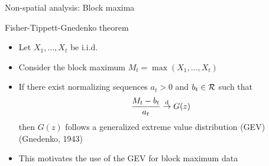 \documentclass{beamer}
\begin{document}



\begin{frame}{Non-spatial analysis: Block maxima}
	\begin{adjustwidth}{1em}{0em}
		Fisher-Tippett-Gnedenko theorem \vspace{1em}
		\begin{itemize} \setlength{\itemsep}{1em}
			\item Let $X_1, \ldots, X_t$ be i.i.d.
			\item Consider the block maximum $M_t = \max(X_1, \ldots, X_t)$
			\item If there exist normalizing sequences $a_t > 0$ and $b_t \in {\cal R}$ such that $$\frac{ M_t - b_t }{ a_t } \stackrel{\mathrm{d}}{\rightarrow} G(z)$$ then $G(z)$ follows a generalized extreme value distribution (GEV) (Gnedenko, 1943)
			\item This motivates the use of the GEV for block maximum data
		\end{itemize}
	\end{adjustwidth}
\end{frame}
\end{document}
